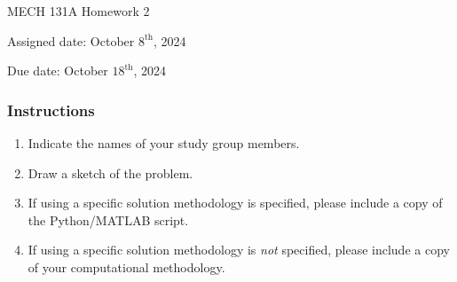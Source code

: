 \documentclass[12pt,letterpaper]{article}
\begin{document}
\noindent
MECH 131A Homework 2

\noindent
Assigned date: October $8^{\mathrm{th}}$, 2024

\noindent
Due date: October $18^{\mathrm{th}}$, 2024

\subsubsection*{Instructions}
\begin{enumerate}
	\item Indicate the names of your study group members.
	\item Draw a sketch of the problem.
	\item If using a specific solution methodology is specified, please include a copy of the Python/MATLAB script.
	\item If using a specific solution methodology is \textit{not} specified, please include a copy of your computational methodology.
\end{enumerate}
\end{document}
